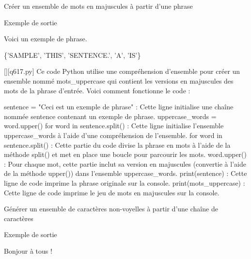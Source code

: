         \question
        Créer un ensemble de mots en majuscules à partir d'une phrase

Exemple de sortie

Voici un exemple de phrase.

\{'SAMPLE', 'THIS', 'SENTENCE.', 'A', 'IS'\}
        \par
        \begin{solution}
            \renewcommand{\nomfichier}{q617.py}
            \pythonfile{\chemincode \nomfichier}[][\nomfichier]
            Ce code Python utilise une compréhension d'ensemble pour créer un ensemble nommé mots_uppercase qui contient les versions en majuscules des mots de la phrase d'entrée. Voici comment fonctionne le code :

    sentence = "Ceci est un exemple de phrase" : Cette ligne initialise une chaîne nommée sentence contenant un exemple de phrase.
    uppercase_words = {word.upper() for word in sentence.split()} : Cette ligne initialise l'ensemble uppercase_words à l'aide d'une compréhension de l'ensemble.
        for word in sentence.split() : Cette partie du code divise la phrase en mots à l'aide de la méthode split() et met en place une boucle pour parcourir les mots.
        {word.upper()} : Pour chaque mot, cette partie inclut sa version en majuscules (convertie à l'aide de la méthode upper()) dans l'ensemble uppercase_words.
    print(sentence) : Cette ligne de code imprime la phrase originale sur la console.
    print(mots_uppercase) : Cette ligne de code imprime le jeu de mots en majuscules sur la console.
        \end{solution}
        

        \question
        Générer un ensemble de caractères non-voyelles à partir d'une chaîne de caractères

Exemple de sortie

Bonjour à tous !

